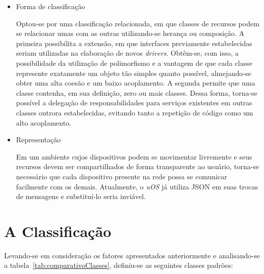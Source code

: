 \begin{itemize}
	\item Forma de classificação

	Optou-se por uma classificação relacionada, em que classes de recursos podem se relacionar umas com as outras utilizando-se herança ou composição. A primeira possibilita a extensão, em que interfaces previamente estabelecidas seriam utilizadas na elaboração de novos \emph{drivers}. Obtêm-se, com isso, a possibilidade da utilização de polimorfismo e a vantagem de que cada classe represente exatamente um objeto tão simples quanto possível, almejando-se obter uma alta coesão e um baixo acoplamento. A segunda permite que uma classe contenha, em sua definição, zero ou mais classes. Dessa forma, torna-se possível a delegação de responsabilidades para serviços existentes em outras classes outrora estabelecidas, evitando tanto a repetição de código como um alto acoplamento.

	\item Representação

	Em um ambiente cujos dispositivos podem se movimentar livremente e seus recursos devem ser compartilhados de forma transparente ao usuário, torna-se necessário que cada dispositivo presente na rede possa se comunicar facilmente com os demais. Atualmente, o \emph{uOS} já utiliza JSON em suas trocas de mensagens e substituí-lo seria inviável.

\end{itemize}

\section{A Classificação}
Levando-se em consideração os fatores apresentados anteriormente e analisando-se a tabela~\ref{tab:comparativoClasses}, definiu-se as seguintes classes padrões:

